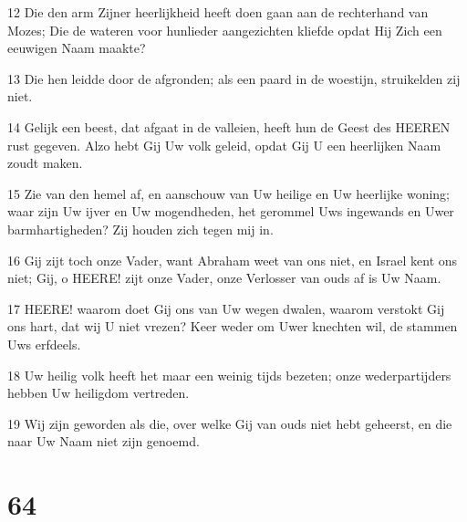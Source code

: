 \par 12 Die den arm Zijner heerlijkheid heeft doen gaan aan de rechterhand van Mozes; Die de wateren voor hunlieder aangezichten kliefde opdat Hij Zich een eeuwigen Naam maakte?
\par 13 Die hen leidde door de afgronden; als een paard in de woestijn, struikelden zij niet.
\par 14 Gelijk een beest, dat afgaat in de valleien, heeft hun de Geest des HEEREN rust gegeven. Alzo hebt Gij Uw volk geleid, opdat Gij U een heerlijken Naam zoudt maken.
\par 15 Zie van den hemel af, en aanschouw van Uw heilige en Uw heerlijke woning; waar zijn Uw ijver en Uw mogendheden, het gerommel Uws ingewands en Uwer barmhartigheden? Zij houden zich tegen mij in.
\par 16 Gij zijt toch onze Vader, want Abraham weet van ons niet, en Israel kent ons niet; Gij, o HEERE! zijt onze Vader, onze Verlosser van ouds af is Uw Naam.
\par 17 HEERE! waarom doet Gij ons van Uw wegen dwalen, waarom verstokt Gij ons hart, dat wij U niet vrezen? Keer weder om Uwer knechten wil, de stammen Uws erfdeels.
\par 18 Uw heilig volk heeft het maar een weinig tijds bezeten; onze wederpartijders hebben Uw heiligdom vertreden.
\par 19 Wij zijn geworden als die, over welke Gij van ouds niet hebt geheerst, en die naar Uw Naam niet zijn genoemd.

\chapter{64}


